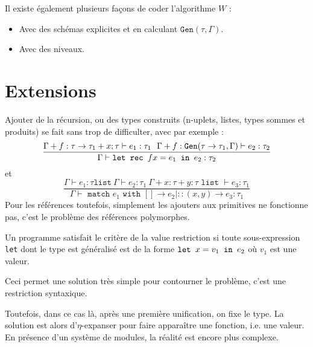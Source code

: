 \documentclass{cours}
\begin{document}
Il existe également plusieurs façons de coder l'algorithme $W$ : 
\begin{itemize}
    \item Avec des schémas explicites et en calculant $\texttt{Gen}(\tau, \Gamma)$.
    \item Avec des niveaux.
\end{itemize}

\section{Extensions}
Ajouter de la récursion, ou des types construits (n-uplets, listes, types sommes et produits) se fait sans trop de difficulter, avec par exemple : 
\[
    \frac{\Gamma + f : \tau \rightarrow \tau_{1} + x ; \tau \vdash e_{1} : \tau_{1} \ \ \Gamma + f : \texttt{Gen}(\tau \rightarrow \tau_{1}, \Gamma) \vdash e_{2} : \tau_{2}}{\Gamma \vdash \texttt{let } \texttt{rec } f x = e_{1} \texttt{ in } e_{2} : \tau_{2}}
\]
et 
\[
    \frac{\Gamma \vdash e_{1} : \tau \texttt{list} \ \Gamma \vdash e_{2} : \tau_{1} \ \Gamma + x : \tau + y : \tau \texttt{ list } \vdash e_{3} : \tau_{1}}{\Gamma \vdash \texttt{ match } e_{1} \texttt{ with } \left[\right] \rightarrow e_{2} \mid ::(x, y) \rightarrow e_{3} : \tau_{1}}
\]
Pour les références toutefois, simplement les ajouters aux primitives ne fonctionne pas, c'est le problème des références polymorphes.

\begin{definition}
    Un programme satisfait le critère de la value restriction si toute sous-expression \texttt{let} dont le type est généralisé est de la forme $\texttt{let } x = v_{1} \texttt{ in } e_{2}$ où $v_{1}$ est une valeur.
\end{definition}
Ceci permet une solution très simple pour contourner le problème, c'est une restriction syntaxique.

Toutefois, dans ce cas là, après une première unification, on fixe le type. La solution est alors d'$\eta$-expanser pour faire apparaître une fonction, i.e. une valeur. En présence d'un système de modules, la réalité est encore plus complexe.
\end{document}
